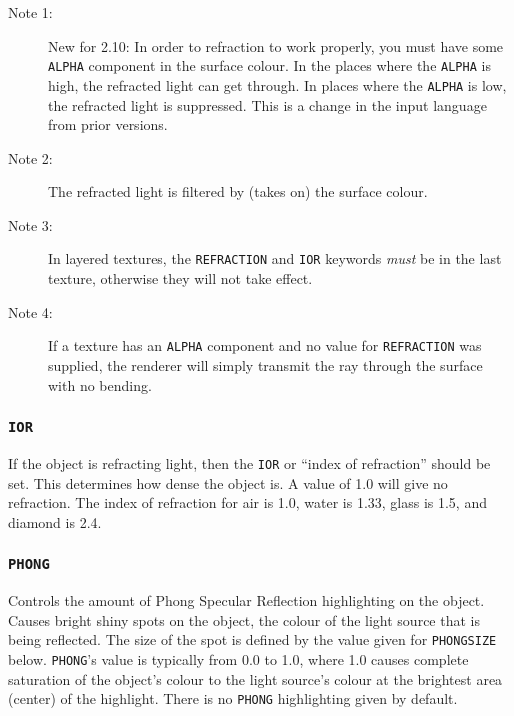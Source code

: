 \begin{description}
\item[Note 1:] New for
2.10:
In order to refraction to work properly, you must have
some {\tt ALPHA} component in the surface colour.  In the places where the
{\tt ALPHA} is high, the refracted light can get through.  In places where
the {\tt ALPHA} is low, the refracted light is suppressed.  This is a
change in the input language from prior versions.
\item[Note 2:] The refracted light is filtered by (takes on) the
surface colour.
\item[Note 3:] In
layered textures, the {\tt REFRACTION} and
{\tt IOR} keywords {\em must} be in the
last texture, otherwise they will not take effect.
\item[Note 4:] If a texture has an {\tt ALPHA} component and no value
for {\tt REFRACTION} was
supplied, the renderer will simply transmit the ray through the
surface with no bending.
\end{description}

\subsubsection{{\tt IOR}}

If the object is refracting light, then the {\tt IOR} or ``index of
refraction'' should be set.  This determines how dense the object is.
A value of 1.0 will give no refraction.  The index of refraction for
air is 1.0, water is 1.33, glass is 1.5, and diamond is 2.4.

\subsubsection{{\tt PHONG}}

Controls the amount of Phong Specular Reflection highlighting on the
object.  Causes bright shiny spots on the object, the colour of the
light source that is being reflected.  The size of the spot is defined
by the value given for {\tt PHONGSIZE} below.  {\tt PHONG}'s value is
typically from 0.0 to 1.0, where 1.0 causes complete saturation of the
object's colour to the light source's colour at the brightest area
(center) of the highlight.  There is no {\tt PHONG} highlighting given
by default.

